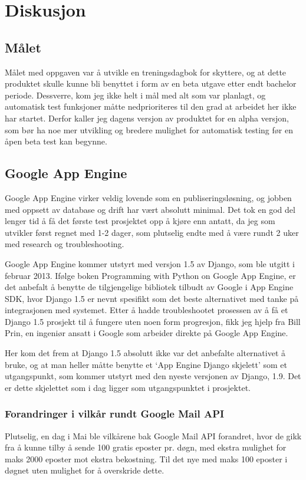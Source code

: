 \chapter{Diskusjon}

\section{Målet}
Målet med oppgaven var å utvikle en treningsdagbok for skyttere, og at dette produktet skulle kunne bli benyttet i form av en beta utgave etter endt bachelor periode. Dessverre, kom jeg ikke helt i mål med alt som var planlagt, og automatisk test funksjoner måtte nedprioriteres til den grad at arbeidet her ikke har startet. Derfor kaller jeg dagens versjon av produktet for en alpha versjon, som bør ha noe mer utvikling og bredere mulighet for automatisk testing før en åpen beta test kan begynne. 

\section{Google App Engine}
Google App Engine virker veldig lovende som en publiseringsløsning, og jobben med oppsett av database og drift har vært absolutt minimal. Det tok en god del lenger tid å få det første test prosjektet opp å kjøre enn antatt, da jeg som utvikler først regnet med 1-2 dager, som plutselig endte med å være rundt 2 uker med research og troubleshooting.


Google App Engine kommer utstyrt med versjon 1.5 av Django, som ble utgitt i februar 2013. Ifølge boken Programming with Python on Google App Engine, er det anbefalt å benytte de tilgjengelige bibliotek tilbudt av Google i App Engine SDK, hvor Django 1.5 er nevnt spesifikt som det beste alternativet med tanke på integrasjonen med systemet. Etter å hadde troubleshootet prosessen av å få et Django 1.5 prosjekt til å fungere uten noen form progresjon, fikk jeg hjelp fra Bill Prin, en ingeniør ansatt i Google som arbeider direkte på Google App Engine.

 
Her kom det frem at Django 1.5 absolutt ikke var det anbefalte alternativet å bruke, og at man heller måtte benytte et ‘App Engine Django skjelett’ som et utgangspunkt, som kommer utstyrt med den nyeste versjonen av Django, 1.9. Det er dette skjelettet som i dag ligger som utgangspunktet i prosjektet.

\subsection{Forandringer i vilkår rundt Google Mail API}
Plutselig, en dag i Mai ble vilkårene bak Google Mail API forandret, hvor de gikk fra å kunne tilby å sende 100 gratis eposter pr. døgn, med ekstra mulighet for maks 2000 eposter mot ekstra bekostning. Til det nye med maks 100 eposter i døgnet uten mulighet for å overskride dette. 


